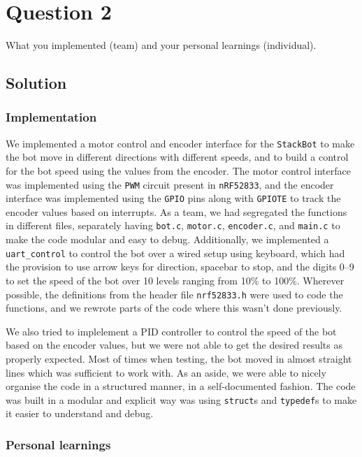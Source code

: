 \section*{Question 2}

What you implemented (team) and your personal learnings (individual).

\subsection*{Solution}

\subsubsection*{Implementation}

We implemented a motor control and encoder interface for the \texttt{StackBot} to make the bot move in different directions with different speeds, and to build a control for the bot speed using the values from the encoder.
The motor control interface was implemented using the \texttt{PWM} circuit present in \texttt{nRF52833}, and the encoder interface was implemented using the \texttt{GPIO} pins along with \texttt{GPIOTE} to track the encoder values based on interrupts.
As a team, we had segregated the functions in different files, separately having \texttt{bot.c}, \texttt{motor.c}, \texttt{encoder.c}, and \texttt{main.c} to make the code modular and easy to debug.
Additionally, we implemented a \texttt{uart\_control} to control the bot over a wired setup using keyboard, which had the provision to use arrow keys for direction, spacebar to stop, and the digits 0--9 to set the speed of the bot over 10 levels ranging from 10\% to 100\%.
Wherever possible, the definitions from the header file \texttt{nrf52833.h} were used to code the functions, and we rewrote parts of the code where this wasn't done previously.

We also tried to implelement a PID controller to control the speed of the bot based on the encoder values, but we were not able to get the desired results as properly expected.
Most of times when testing, the bot moved in almost straight lines which was sufficient to work with.
As an aside, we were able to nicely organise the code in a structured manner, in a self-documented fashion.
The code was built in a modular and explicit way was using \texttt{struct}s and \texttt{typedef}s to make it easier to understand and debug.

\subsubsection*{Personal learnings}

